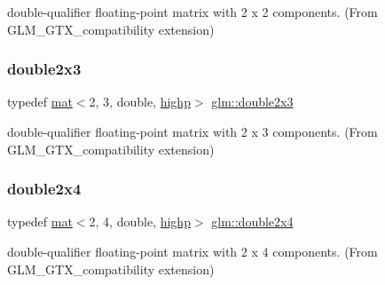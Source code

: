 double-\/qualifier floating-\/point matrix with 2 x 2 components. (From G\+L\+M\+\_\+\+G\+T\+X\+\_\+compatibility extension) 

\mbox{\label{group__gtx__compatibility_gaaf4151b4dcb70d412df4c4a1cfccd575}} 
\subsubsection{\texorpdfstring{double2x3}{double2x3}}
{\footnotesize\ttfamily typedef \hyperlink{structglm_1_1mat}{mat}$<$2, 3, double, \hyperlink{namespaceglm_a36ed105b07c7746804d7fdc7cc90ff25ac6f7eab42eacbb10d59a58e95e362074}{highp}$>$ \hyperlink{group__gtx__compatibility_gaaf4151b4dcb70d412df4c4a1cfccd575}{glm\+::double2x3}}



double-\/qualifier floating-\/point matrix with 2 x 3 components. (From G\+L\+M\+\_\+\+G\+T\+X\+\_\+compatibility extension) 

\mbox{\label{group__gtx__compatibility_ga64a5113afe95db296ff0593232ac772d}} 
\subsubsection{\texorpdfstring{double2x4}{double2x4}}
{\footnotesize\ttfamily typedef \hyperlink{structglm_1_1mat}{mat}$<$2, 4, double, \hyperlink{namespaceglm_a36ed105b07c7746804d7fdc7cc90ff25ac6f7eab42eacbb10d59a58e95e362074}{highp}$>$ \hyperlink{group__gtx__compatibility_ga64a5113afe95db296ff0593232ac772d}{glm\+::double2x4}}



double-\/qualifier floating-\/point matrix with 2 x 4 components. (From G\+L\+M\+\_\+\+G\+T\+X\+\_\+compatibility extension) 

\mbox{\label{group__gtx__compatibility_ga59c2d0879cea219643aec2f75b8beee9}} 
